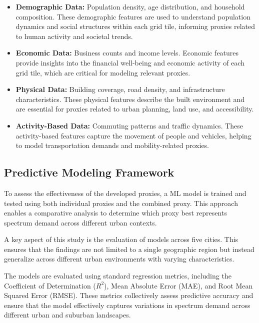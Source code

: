 \documentclass[conference]{IEEEtran}
\begin{document}
\begin{itemize}
\item \textbf{Demographic Data:} Population density, age distribution, and household composition. These demographic features are used to understand population dynamics and social structures within each grid tile, informing proxies related to human activity and societal trends.

\item \textbf{Economic Data:} Business counts and income levels. Economic features provide insights into the financial well-being and economic activity of each grid tile, which are critical for modeling relevant proxies.

\item \textbf{Physical Data:} Building coverage, road density, and infrastructure characteristics. These physical features describe the built environment and are essential for proxies related to urban planning, land use, and accessibility.

\item \textbf{Activity-Based Data:} Commuting patterns and traffic dynamics. These activity-based features capture the movement of people and vehicles, helping to model transportation demands and mobility-related proxies.
\end{itemize}






\subsection{Predictive Modeling Framework}

To assess the effectiveness of the developed proxies, a ML model is trained and tested using both individual proxies and the combined proxy. This approach enables a comparative analysis to determine which proxy best represents spectrum demand across different urban contexts.

A key aspect of this study is the evaluation of models across five cities. This ensures that the findings are not limited to a single geographic region but instead generalize across different urban environments with varying characteristics.


The models are evaluated using standard regression metrics, including the Coefficient of Determination (\(R^2\)), Mean Absolute Error (MAE), and Root Mean Squared Error (RMSE). These metrics collectively assess predictive accuracy and ensure that the model effectively captures variations in spectrum demand across different urban and suburban landscapes.
\end{document}
